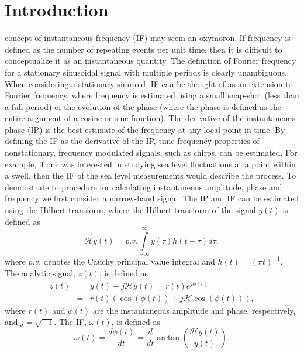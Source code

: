 \documentclass[journal,11pt,a4paper,onecolumn,draftcls]{IEEEtran}
\begin{document}
\section{Introduction}
 concept of instantaneous frequency (IF) may seem an oxymoron. If frequency is defined as the number of repeating events per unit time, then it is difficult to conceptualize it as an instantaneous quantity. The definition of Fourier frequency for a stationary sinusoidal signal with multiple periods is clearly unambiguous. When considering a stationary sinusoid, IF can be thought of as an extension to Fourier frequency, where frequency is estimated using a small snap-shot (less than a full period) of the evolution of the phase (where the phase is defined as the entire argument of a cosine or sine function). The derivative of the instantaneous phase (IP) is the best estimate of the frequency at any local point in time. By defining the IF as the derivative of the IP, time-frequency properties of nonstationary, frequency modulated signals, such as chirps, can be estimated. For example, if one was interested in studying sea level fluctuations at a point within a swell, then the IF of the sea level measurements would describe the process. To demonstrate to procedure for calculating instantaneous amplitude, phase and frequency we first consider a narrow-band signal. The IP and IF can be estimated using the Hilbert transform, where the Hilbert transform of the signal $y(t)$ is defined as
\begin{equation}\label{eq:HilbertTransform}
\mathcal{H}y\left( t \right) = p.v.\int\limits_{ - \infty }^\infty  {y\left( \tau  \right)h\left( {t - \tau } \right)} d\tau,
\end{equation}
where $p.v.$ denotes the Cauchy principal value integral and $h\left( t \right) = {\left( {\pi t} \right)^{ - 1}}$. The analytic signal, $z(t)$, is defined as
\begin{eqnarray}\label{eq:AnalyticSignal}
z\left( t \right) &=& y\left( t \right) + j\mathcal{H}y\left( t \right) = r\left( t \right){e^{j\phi \left( t \right)}}\\
    &=& r\left( t \right)\left(\cos\left(\phi\left(t\right)\right) + j \mathcal{H}\cos\left(\phi\left(t\right)\right)\right),
\end{eqnarray}
where $r(t)$ and $\phi(t)$ are the instantaneous amplitude and phase, respectively, and $j=\sqrt{-1}$. The IF, $\omega(t)$, is defined as
\begin{equation}\label{eq:InstantaneousFreq}
\omega \left( t \right) = \frac{d\phi \left( t \right)}{dt} = \frac{d}{dt}\arctan\left(\frac{\mathcal{H}y\left( t \right)}{y\left(t\right)}\right).
\end{equation}
\end{document}
